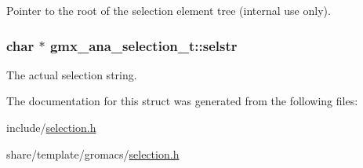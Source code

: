 \-Pointer to the root of the selection element tree (internal use only). 

\hypertarget{structgmx__ana__selection__t_a32be3edd9d2953ce5991391a5a5b6f67}{
\subsubsection[{selstr}]{\setlength{\rightskip}{0pt plus 5cm}char $\ast$ {\bf gmx\-\_\-ana\-\_\-selection\-\_\-t\-::selstr}}}\label{structgmx__ana__selection__t_a32be3edd9d2953ce5991391a5a5b6f67}
\-The actual selection string. 

\-The documentation for this struct was generated from the following files\-:\begin{DoxyCompactItemize}
\item 
include/\hyperlink{include_2selection_8h}{selection.\-h}\item 
share/template/gromacs/\hyperlink{share_2template_2gromacs_2selection_8h}{selection.\-h}\end{DoxyCompactItemize}
